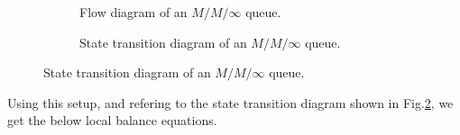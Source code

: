 \documentclass[11pt, a4paper]{report}
\begin{document}
\begin{figure}[ht]   
    \begin{subfigure}[b]{0.55\textwidth}
        \centering
        
        \caption{Flow diagram of an $M/M/\infty$ queue.}
        \label{fig:blk_mminfinite}
    \end{subfigure}
    \hfill
    \begin{subfigure}[b]{0.55\textwidth}
        \centering
        
        \caption{State transition diagram of an $M/M/\infty$ queue.}
        \label{fig:std_mminfinite}
    \end{subfigure}
    \label{fig:mminfinite_dig}
\end{figure}
Using this setup, and refering to the state transition diagram shown in Fig.\ref{fig:std_mminfinite}, we get the below local balance equations.
\end{document}
